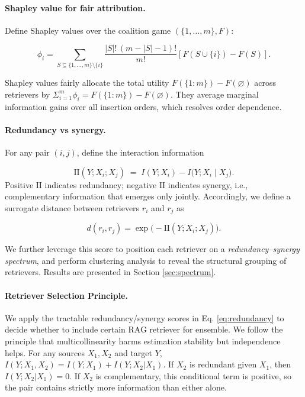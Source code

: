 \documentclass{article}
\theoremstyle{plain}
\theoremstyle{definition}
\theoremstyle{remark}
\begin{document}
\paragraph{Shapley value for fair attribution.}
Define Shapley values over the coalition game $(\{1,\dots,m\},F)$:
\begin{tiny}
\begin{equation}
\phi_i=\sum_{S\subseteq \{1,\dots,m\}\setminus\{i\}}
\frac{|S|!\,(m-|S|-1)!}{m!}\left[F(S\cup\{i\})-F(S)\right].
\end{equation}
\end{tiny}
Shapley values fairly allocate the total utility $F(\{1{:}m\})-F(\varnothing)$ across retrievers by $\Sigma_{i=1}^m \phi_i = F(\{1{:}m\})-F(\varnothing)$. They average marginal information gains over all insertion orders, which resolves order dependence.


\paragraph{Redundancy vs synergy.}
For any pair $(i,j)$, define the interaction information

\begin{equation}
\label{eq:redundancy}
\mathrm{II}(Y;X_i;X_j) \;=\; I(Y;X_i) - I\big(Y;X_i \mid X_j\big).
\end{equation}
Positive $\mathrm{II}$ indicates redundancy; negative $\mathrm{II}$ indicates synergy, i.e., complementary information that emerges only jointly.
Accordingly, we define a surrogate distance between retrievers $r_i$ and $r_j$ as 

\begin{equation}
\label{eq:dist def}
d(r_i,r_j) = \exp\!\big(-\mathrm{II}(Y;X_i;X_j)\big).
\end{equation}

We further leverage this score to position each retriever on a \textit{redundancy--synergy spectrum}, and perform clustering analysis to reveal the structural grouping of retrievers. Results are presented in Section \ref{sec:spectrum}.



\paragraph{Retriever Selection Principle.}
We apply the tractable redundancy/synergy scores in Eq. \eqref{eq:redundancy} to decide whether to include certain RAG retriever for ensemble. We follow the principle that multicollinearity harms estimation stability but independence helps. For any sources $X_1, X_2$ and target $Y$, $I(Y; X_1,X_2)=I(Y;X_1)+I(Y;X_2|X_1)$. If $X_2$ is redundant given $X_1$, then $I(Y;X_2|X_1)=0$. If $X_2$ is complementary, this conditional term is positive, so the pair contains strictly more information than either alone.
\end{document}
